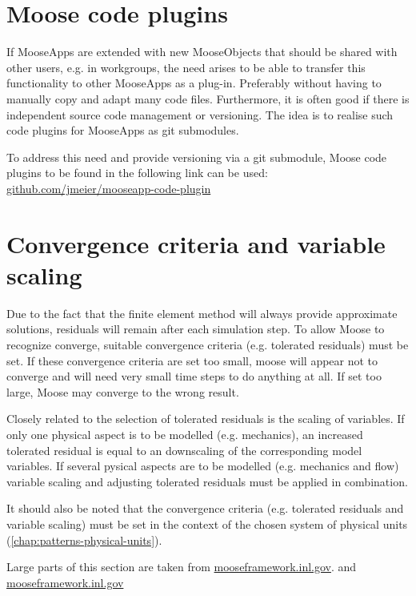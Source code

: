 \section{Moose code plugins}
\label{chap:patterns-code-plugins}

If MooseApps are extended with new MooseObjects that should be shared with
other users, e.g. in workgroups, the need arises to be able to transfer this
functionality to other MooseApps as a plug-in. Preferably without having to
manually copy and adapt many code files. Furthermore, it is often good if there
is independent source code management or versioning. The idea is to realise
such code plugins for MooseApps as git submodules.

To address this need and provide versioning via a git submodule, Moose code
plugins to be found in the following link can be used:
\href{https://github.com/jmeier/mooseapp-code-plugin}{github.com/jmeier/mooseapp-code-plugin}

\section{Convergence criteria and variable scaling}
\label{chap:patterns-converge-criteria-and-scaling}

Due to the fact that the finite element method will always provide approximate
solutions, residuals will remain after each simulation step. To allow Moose to
recognize converge, suitable convergence criteria (e.g. tolerated residuals)
must be set. If these convergence criteria are set too small, moose will appear
not to converge and will need very small time steps to do anything at all. If
set too large, Moose may converge to the wrong result.

Closely related to the selection of tolerated residuals is the scaling of
variables. If only one physical aspect is to be modelled (e.g. mechanics), an
increased tolerated residual is equal to an downscaling of the corresponding
model variables. If several pysical aspects are to be modelled (e.g. mechanics
and flow) variable scaling and adjusting tolerated residuals must be applied in
combination.

It should also be noted that the convergence criteria (e.g. tolerated residuals
and variable scaling) must be set in the context of the chosen system of
physical units (\autoref{chap:patterns-physical-units}).

Large parts of this section are taken from
\href{https://mooseframework.inl.gov/modules/porous_flow/convergence.html}{mooseframework.inl.gov}.
and
\href{https://mooseframework.inl.gov/modules/solid_mechanics/Convergence.html}{mooseframework.inl.gov}

